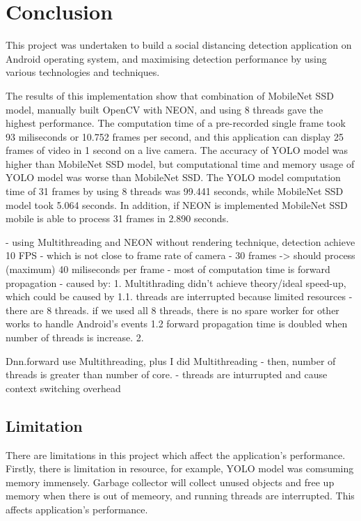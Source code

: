 \chapter{Conclusion}\label{conclusion}

    This project was undertaken to build a social distancing detection application on Android operating system,
    and maximising detection performance by using various technologies and techniques.

    The results of this implementation show that combination of MobileNet SSD model,
    manually built OpenCV with NEON, and using 8 threads gave the highest performance.
    The computation time of a pre-recorded single frame took 93 miliseconds or 10.752 frames per second,
    and this application can display 25 frames of video in 1 second on a live camera.
    The accuracy of YOLO model was higher than MobileNet SSD model,
    but computational time and memory usage of YOLO model was worse than MobileNet SSD.
    The YOLO model computation time of 31 frames by using 8 threads was 99.441 seconds,
    while MobileNet SSD model took 5.064 seconds.
    In addition, if NEON is implemented MobileNet SSD mobile is able to process 31 frames in 2.890 seconds.

        - using Multithreading and NEON without rendering technique, detection achieve 10 FPS
            - which is not close to frame rate of camera
        - 30 frames -> should process (maximum) 40 miliseconds per frame
        - most of computation time is forward propagation
        - caused by:
            1. Multithrading didn't achieve theory/ideal speed-up, which could be caused by
                1.1. threads are interrupted because limited resources
                    - there are 8 threads. if we used all 8 threads, there is no spare worker for other works
                        to handle Android's events
                1.2 forward propagation time is doubled when number of threads is increase.
            2.

            Dnn.forward use Multithreading, plus I did Multithreading
            - then, number of threads is greater than number of core.
            - threads are inturrupted and cause context switching overhead

    \section{Limitation}
        There are limitations in this project which affect the application's performance.
        Firstly, there is limitation in resource, for example, YOLO model was comsuming memory immensely.
        Garbage collector will collect unused objects and free up memory when there is out of memeory,
        and running threads are interrupted.
        This affects application's performance.

